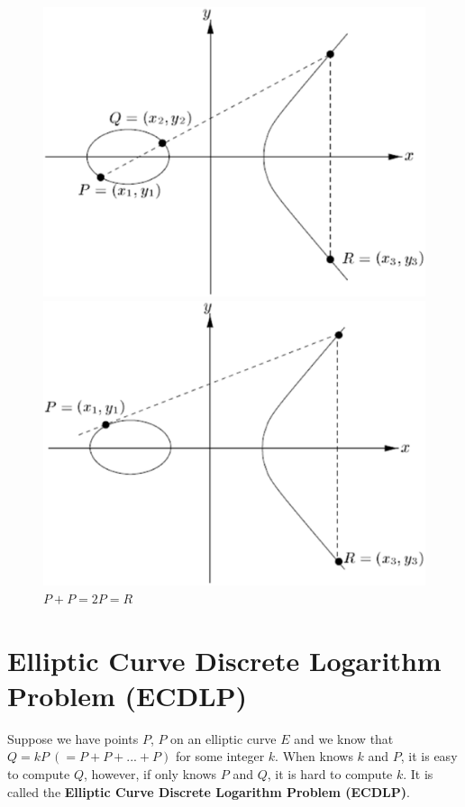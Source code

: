 \documentclass[10pt,a4paper]{article}
\begin{document}
\begin{figure}
\begin{minipage}[width=0.5\linewidth]{0.5\linewidth}
  \centering
    \includegraphics[scale=0.3]{p1p2.eps}
  \caption{$P + Q = R\ (P \neq Q)$}
  \label{table:p1p2_1}
\end{minipage}
\begin{minipage}[width=0.5\linewidth]{0.5\linewidth}
  \centering
    \includegraphics[scale=0.3]{2p.eps}
  \caption{$P + P = 2P = R$}
  \label{table:p1p2_2}
\end{minipage}
\end{figure}

\section{Elliptic Curve Discrete Logarithm Problem (ECDLP)}
\indent Suppose we have points $P$, $P$ on an elliptic curve $E$ and we know that $Q = kP\ (= P + P + ... + P)$ for some integer $k$. When knows $k$ and $P$, it is easy to compute $Q$, however, if only knows $P$ and $Q$, it is hard to compute $k$. It is called the \textbf{Elliptic Curve Discrete Logarithm Problem (ECDLP)}.
\end{document}

